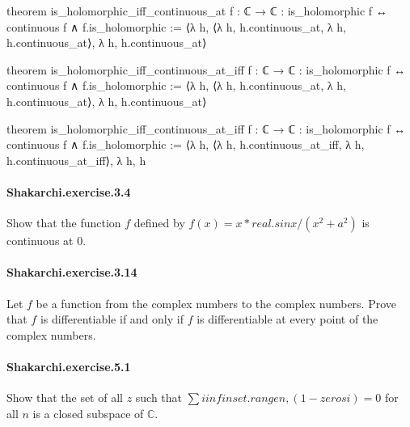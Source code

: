 \documentclass{article}
\begin{document}
theorem is_holomorphic_iff_continuous_at {f : ℂ → ℂ} :
  is_holomorphic f ↔ continuous f ∧ f.is_holomorphic :=
⟨λ h, ⟨λ h, h.continuous_at, λ h, h.continuous_at⟩, λ h, h.continuous_at⟩

theorem is_holomorphic_iff_continuous_at_iff {f : ℂ → ℂ} :
  is_holomorphic f ↔ continuous f ∧ f.is_holomorphic :=
⟨λ h, ⟨λ h, h.continuous_at, λ h, h.continuous_at⟩, λ h, h.continuous_at⟩

theorem is_holomorphic_iff_continuous_at_iff {f : ℂ → ℂ} :
  is_holomorphic f ↔ continuous f ∧ f.is_holomorphic :=
⟨λ h, ⟨λ h, h.continuous_at_iff, λ h, h.continuous_at_iff⟩, λ h, h

\paragraph{Shakarchi.exercise.3.4} Show that the function $f$ defined by $f(x) = x * real.sin x / (x ^ 2 + a ^ 2)$ is continuous at $0$.

\paragraph{Shakarchi.exercise.3.14} Let $f$ be a function from the complex numbers to the complex numbers. Prove that $f$ is differentiable if and only if $f$ is differentiable at every point of the complex numbers.

\paragraph{Shakarchi.exercise.5.1} Show that the set of
  all $z$ such that $∑ i in finset.range n, (1 - zeros i) = 0$ for all $n$ is a closed
  subspace of $\mathbb{C}$.
\end{document}
